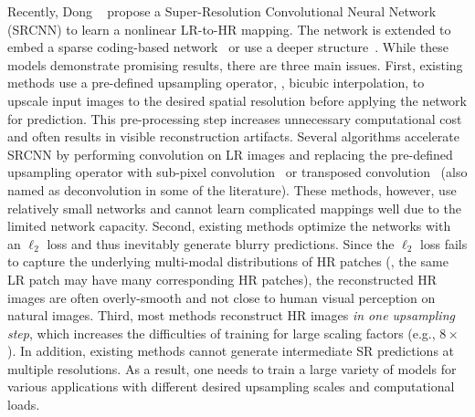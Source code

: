 \documentclass[10pt,twocolumn,letterpaper]{article}
\begin{document}
	
	
	Recently, Dong \etal~\cite{SRCNN} propose a Super-Resolution Convolutional Neural Network (SRCNN) to learn a nonlinear LR-to-HR mapping.
	The network is extended to embed a sparse coding-based network~\cite{SCN} or use a deeper structure~\cite{VDSR}. 
	While these models demonstrate promising results, there are three main issues.
	First, existing methods use a pre-defined upsampling operator, \eg, bicubic interpolation, to upscale input images to the desired spatial resolution before applying the network for prediction.
	This pre-processing step increases unnecessary computational cost and often results in visible reconstruction artifacts.
	Several algorithms accelerate SRCNN by performing convolution on LR images and replacing the pre-defined upsampling operator with sub-pixel convolution~\cite{ESPCN} or transposed convolution~\cite{FSRCNN} (also named as deconvolution in some of the literature).
	These methods, however, use relatively small networks and cannot learn complicated mappings well due to the limited network capacity.
	Second, existing methods optimize the networks with an $\ell_2$ loss and thus inevitably generate blurry predictions.
	Since the $\ell_2$ loss fails to capture the underlying multi-modal distributions of HR patches (\ie, the same LR patch may have many corresponding HR patches), the reconstructed HR images are often overly-smooth and not close to human visual perception on natural images. 
	Third, most methods reconstruct HR images \textit{in one upsampling step}, which increases the difficulties of training for large scaling factors (e.g., $8\times$).
	In addition, existing methods cannot generate intermediate SR predictions at multiple resolutions.
	As a result, one needs to train a large variety of models for various applications with different desired upsampling scales and computational loads.
	
\end{document}
